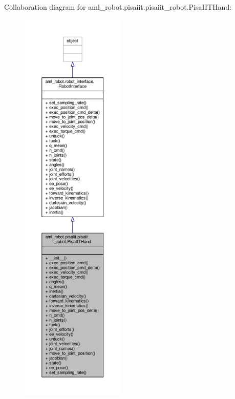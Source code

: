 Collaboration diagram for aml\-\_\-robot.\-pisaiit.\-pisaiit\-\_\-robot.\-Pisa\-I\-I\-T\-Hand\-:
\nopagebreak
\begin{figure}[H]
\begin{center}
\leavevmode
\includegraphics[height=550pt]{classaml__robot_1_1pisaiit_1_1pisaiit__robot_1_1_pisa_i_i_t_hand__coll__graph}
\end{center}
\end{figure}
